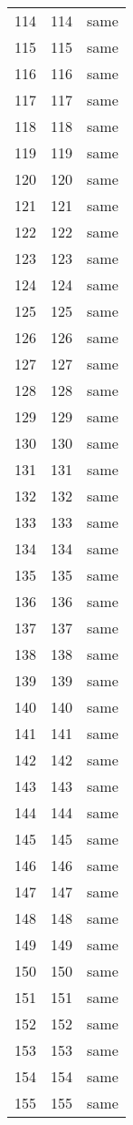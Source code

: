 \documentclass{article}%
\begin{document}
\begin{longtable}{lrl}
114 &  114 &  same \\
115 &  115 &  same \\
116 &  116 &  same \\
117 &  117 &  same \\
118 &  118 &  same \\
119 &  119 &  same \\
120 &  120 &  same \\
121 &  121 &  same \\
122 &  122 &  same \\
123 &  123 &  same \\
124 &  124 &  same \\
125 &  125 &  same \\
126 &  126 &  same \\
127 &  127 &  same \\
128 &  128 &  same \\
129 &  129 &  same \\
130 &  130 &  same \\
131 &  131 &  same \\
132 &  132 &  same \\
133 &  133 &  same \\
134 &  134 &  same \\
135 &  135 &  same \\
136 &  136 &  same \\
137 &  137 &  same \\
138 &  138 &  same \\
139 &  139 &  same \\
140 &  140 &  same \\
141 &  141 &  same \\
142 &  142 &  same \\
143 &  143 &  same \\
144 &  144 &  same \\
145 &  145 &  same \\
146 &  146 &  same \\
147 &  147 &  same \\
148 &  148 &  same \\
149 &  149 &  same \\
150 &  150 &  same \\
151 &  151 &  same \\
152 &  152 &  same \\
153 &  153 &  same \\
154 &  154 &  same \\
155 &  155 &  same \\

\end{longtable}
\end{document}
